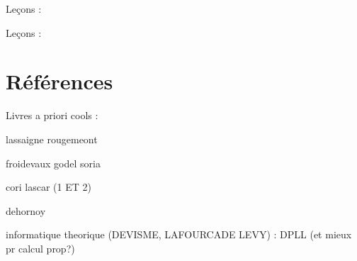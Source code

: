 \documentclass[../Agregation.tex]{subfiles}
\begin{document}



Leçons :
\begin{itemize}
\end{itemize}

Leçons :
\begin{itemize}
\end{itemize}



\chapter{Références}

Livres a priori cools : \textcite{Kozen:1992:DAA:121450}

\printbibliography[segment=1,resetnumbers]

lassaigne rougemeont

froidevaux godel soria

cori lascar (1 ET 2)

dehornoy

informatique theorique (DEVISME, LAFOURCADE LEVY) : DPLL (et mieux pr calcul prop?)
\end{document}
